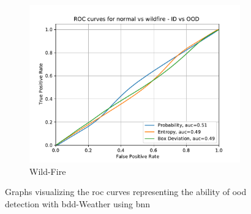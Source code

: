     \begin{figure}[H] \ContinuedFloat
    	\begin{center}
    	\begin{subfigure}[t]{0.495\textwidth}
    		\centering
    		\includegraphics[width=\textwidth]{images/weather_roc/normal vs wildfire_ROC_Score_using_bnn.pdf}
    		\caption{Wild-Fire}
    	\end{subfigure}
    	\end{center}
    	\caption[ROC curves of weather \acrshort{ood} detection using \acrshort{bnn}]{Graphs visualizing the \acrshort{roc} curves representing the ability of \acrshort{ood} detection with \acrshort{bdd}-Weather using \acrshort{bnn}}
    	\label{uq_weather_roc_curves}
    \end{figure}
    
